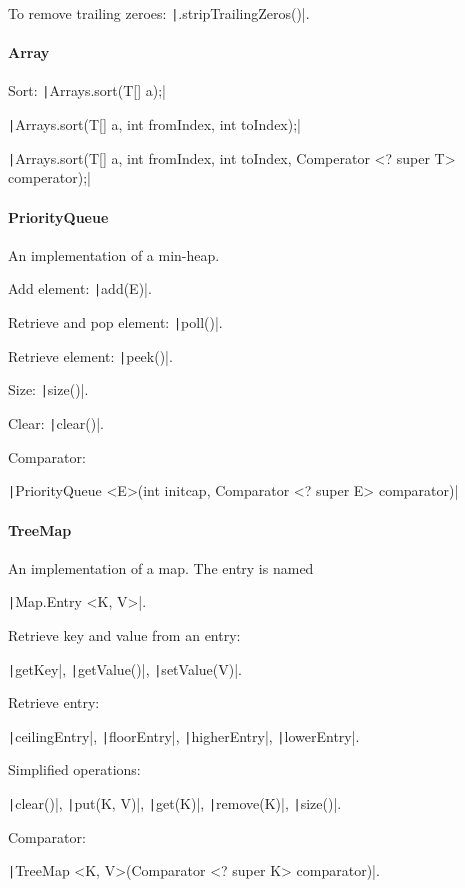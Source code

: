 To remove trailing zeroes: \texttt|.stripTrailingZeros()|.

\paragraph{Array}
Sort: \texttt|Arrays.sort(T[] a);|

\texttt|Arrays.sort(T[] a, int fromIndex, int toIndex);|

\texttt|Arrays.sort(T[] a, int fromIndex, int toIndex, Comperator <? super T> comperator);|

\paragraph{PriorityQueue}
An implementation of a min-heap.

Add element: \texttt|add(E)|.

Retrieve and pop element: \texttt|poll()|.

Retrieve element: \texttt|peek()|.

Size: \texttt|size()|.

Clear: \texttt|clear()|.

Comparator:

\texttt|PriorityQueue <E>(int initcap, Comparator <? super E> comparator)|

\paragraph{TreeMap}
An implementation of a map. The entry is named 

\texttt|Map.Entry <K, V>|.

Retrieve key and value from an entry:

\texttt|getKey|, \texttt|getValue()|, \texttt|setValue(V)|.

Retrieve entry:

\texttt|ceilingEntry|, \texttt|floorEntry|, \texttt|higherEntry|, \texttt|lowerEntry|.

Simplified operations:

\texttt|clear()|, \texttt|put(K, V)|, \texttt|get(K)|, \texttt|remove(K)|, \texttt|size()|.

Comparator:

\texttt|TreeMap <K, V>(Comparator <? super K> comparator)|.

